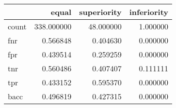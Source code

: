 \begin{tabular}{lrrr}
\toprule
{} &       equal &  superiority &  inferiority \\
\midrule
count &  338.000000 &    48.000000 &     1.000000 \\
fnr   &    0.566848 &     0.404630 &     0.000000 \\
fpr   &    0.439514 &     0.259259 &     0.000000 \\
tnr   &    0.560486 &     0.407407 &     0.111111 \\
tpr   &    0.433152 &     0.595370 &     0.000000 \\
bacc  &    0.496819 &     0.427315 &     0.000000 \\
\bottomrule
\end{tabular}
